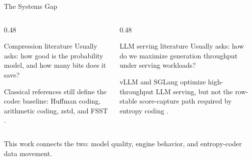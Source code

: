 \begin{frame}{The Systems Gap}
  \begin{columns}[T, onlytextwidth]
    \begin{column}{0.48\textwidth}
      \begin{block}{Compression literature}
        Usually asks: how good is the probability model, and how many bits does it save?
      \end{block}
      \small Classical references still define the codec baseline: Huffman coding, arithmetic coding, zstd, and FSST \parencite{Huffman1952AMF,rissanenArithmeticCoding1979,zstd,fsst}.
    \end{column}
    \hfill
    \begin{column}{0.48\textwidth}
      \begin{block}{LLM serving literature}
        Usually asks: how do we maximize generation throughput under serving workloads?
      \end{block}
      \small vLLM and SGLang optimize high-throughput LLM serving, but not the row-stable score-capture path required by entropy coding \parencite{kwonEfficientMemoryManagement2023,zhengSGLangEfficientExecution2024}.
    \end{column}
  \end{columns}

  \vspace{0.8em}
  \centering
  \small This work connects the two: model quality, engine behavior, and entropy-coder data movement.
\end{frame}
